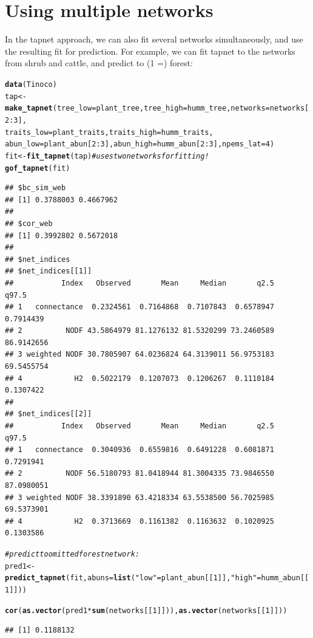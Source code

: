 \documentclass[a4paper, 11pt]{article}\usepackage[]{graphicx}\usepackage[]{color}
\makeatletter
\newcommand{\hlnum}[1]{\textcolor[rgb]{0.686,0.059,0.569}{#1}}%
\newcommand{\hlstr}[1]{\textcolor[rgb]{0.192,0.494,0.8}{#1}}%
\newcommand{\hlcom}[1]{\textcolor[rgb]{0.678,0.584,0.686}{\textit{#1}}}%
\newcommand{\hlopt}[1]{\textcolor[rgb]{0,0,0}{#1}}%
\newcommand{\hlstd}[1]{\textcolor[rgb]{0.345,0.345,0.345}{#1}}%
\newcommand{\hlkwb}[1]{\textcolor[rgb]{0.69,0.353,0.396}{#1}}%
\newcommand{\hlkwc}[1]{\textcolor[rgb]{0.333,0.667,0.333}{#1}}%
\newcommand{\hlkwd}[1]{\textcolor[rgb]{0.737,0.353,0.396}{\textbf{#1}}}%
\newenvironment{kframe}{%
 \def\at@end@of@kframe{}%
 \ifinner\ifhmode%
  \def\at@end@of@kframe{\end{minipage}}%
  \begin{minipage}{\columnwidth}%
 \fi\fi%
 \def\FrameCommand##1{\hskip\@totalleftmargin \hskip-\fboxsep
 \colorbox{shadecolor}{##1}\hskip-\fboxsep
     \hskip-\linewidth \hskip-\@totalleftmargin \hskip\columnwidth}%
 \MakeFramed {\advance\hsize-\width
   \@totalleftmargin\z@ \linewidth\hsize
   \@setminipage}}%
 {\par\unskip\endMakeFramed%
 \at@end@of@kframe}
\newenvironment{knitrout}{}{} %
\makeatother
\begin{document}
\section{Using multiple networks}
In the tapnet approach, we can also fit several networks simultaneously, and use the resulting fit for prediction. For example, we can fit tapnet to the networks from shrub and cattle, and predict to (1 =) forest:
\begin{knitrout}\small
{}\color{fgcolor}\begin{kframe}
\begin{alltt}
\hlkwd{data}\hlstd{(Tinoco)}
\hlstd{tap} \hlkwb{<-} \hlkwd{make_tapnet}\hlstd{(}\hlkwc{tree_low} \hlstd{= plant_tree,} \hlkwc{tree_high} \hlstd{= humm_tree,} \hlkwc{networks} \hlstd{= networks[}\hlnum{2}\hlopt{:}\hlnum{3}\hlstd{],}
                   \hlkwc{traits_low} \hlstd{= plant_traits,} \hlkwc{traits_high} \hlstd{= humm_traits,}
                   \hlkwc{abun_low} \hlstd{= plant_abun[}\hlnum{2}\hlopt{:}\hlnum{3}\hlstd{],} \hlkwc{abun_high}\hlstd{=humm_abun[}\hlnum{2}\hlopt{:}\hlnum{3}\hlstd{] ,} \hlkwc{npems_lat} \hlstd{=} \hlnum{4}\hlstd{)}
\hlstd{fit} \hlkwb{<-} \hlkwd{fit_tapnet}\hlstd{(tap)} \hlcom{# uses two networks for fitting!}
\hlkwd{gof_tapnet}\hlstd{(fit)}
\end{alltt}
\begin{verbatim}
## $bc_sim_web
## [1] 0.3788003 0.4667962
## 
## $cor_web
## [1] 0.3992802 0.5672018
## 
## $net_indices
## $net_indices[[1]]
##           Index   Observed       Mean     Median       q2.5      q97.5
## 1   connectance  0.2324561  0.7164868  0.7107843  0.6578947  0.7914439
## 2          NODF 43.5864979 81.1276132 81.5320299 73.2460589 86.9142656
## 3 weighted NODF 30.7805907 64.0236824 64.3139011 56.9753183 69.5455754
## 4            H2  0.5022179  0.1207073  0.1206267  0.1110184  0.1307422
## 
## $net_indices[[2]]
##           Index   Observed       Mean     Median       q2.5      q97.5
## 1   connectance  0.3040936  0.6559816  0.6491228  0.6081871  0.7291941
## 2          NODF 56.5180793 81.0418944 81.3004335 73.9846550 87.0980051
## 3 weighted NODF 38.3391890 63.4218334 63.5538500 56.7025985 69.5373901
## 4            H2  0.3713669  0.1161382  0.1163632  0.1020925  0.1303586
\end{verbatim}
\begin{alltt}
\hlcom{# predict to omitted forest network:}
\hlstd{pred1} \hlkwb{<-} \hlkwd{predict_tapnet}\hlstd{(fit,} \hlkwc{abuns}\hlstd{=}\hlkwd{list}\hlstd{(}\hlstr{"low"}\hlstd{=plant_abun[[}\hlnum{1}\hlstd{]],} \hlstr{"high"}\hlstd{=humm_abun[[}\hlnum{1}\hlstd{]] ))}

\hlkwd{cor}\hlstd{(}\hlkwd{as.vector}\hlstd{(pred1}\hlopt{*}\hlkwd{sum}\hlstd{(networks[[}\hlnum{1}\hlstd{]])),} \hlkwd{as.vector}\hlstd{(networks[[}\hlnum{1}\hlstd{]]))}
\end{alltt}
\begin{verbatim}
## [1] 0.1188132
\end{verbatim}
\end{kframe}
\end{knitrout}
\end{document}

